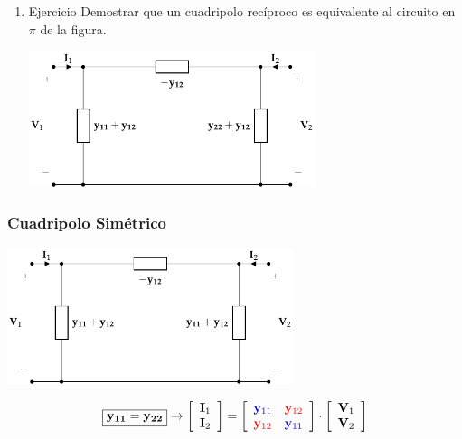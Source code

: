 \begin{enumerate}
\item Ejercicio
\label{sec:orgeb5b5d1}
Demostrar que un cuadripolo recíproco es equivalente al circuito en \(\pi\) de la figura.
\begin{center}
\includegraphics[height=4cm]{../figs/circuitoEquivalenteYReciproco.pdf}
\end{center}
\end{enumerate}

\subsubsection{Cuadripolo Simétrico}
\label{sec:orgbe5cf36}

\begin{center}
\includegraphics[height=4cm]{../figs/circuitoEquivalenteYSimetrico.pdf}
\end{center}


\[
\boxed{\mathbf{y_{11}} = \mathbf{y_{22}}}
\rightarrow
\left[
    \begin{array}{c}
      \mathbf{I}_1\\
      \mathbf{I}_2
    \end{array}
  \right] =
  \left[
    \begin{array}{cc}
      \color{blue}{\mathbf{y}_{11}} & \color{red}{\mathbf{y}_{12}}\\
      \color{red}{\mathbf{y}_{12}} & \color{blue}{\mathbf{y}_{11}}
    \end{array}
  \right] \cdot
  \left[
    \begin{array}{c}
      \mathbf{V}_1\\
      \mathbf{V}_2
    \end{array}
  \right]
\]


